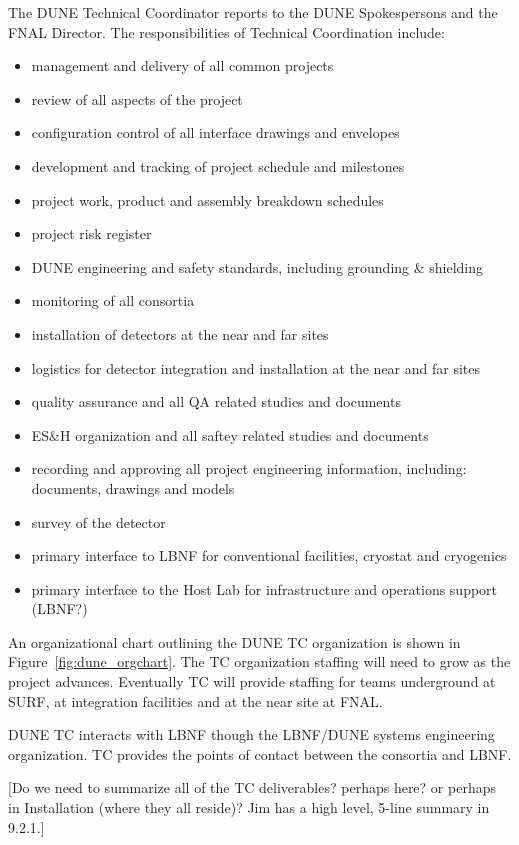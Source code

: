 The DUNE Technical Coordinator reports to the DUNE Spokespersons and the
FNAL Director. The responsibilities of Technical Coordination include:
\begin{itemize}
  \item management and delivery of all common projects
  \item review of all aspects of the project
  \item configuration control of all interface drawings and envelopes
  \item development and tracking of project schedule and milestones
  \item project work, product and assembly breakdown schedules
  \item project risk register
  \item DUNE engineering and safety standards, including grounding \& shielding
  \item monitoring of all consortia
  \item installation of detectors at the near and far sites
  \item logistics for detector integration and installation at the near and far sites
  \item quality assurance and all QA related studies and documents
  \item ES\&H organization and all saftey related studies and documents
  \item recording and approving all project engineering information, including: documents, drawings and models
  \item survey of the detector
  \item primary interface to LBNF for conventional facilities, cryostat and cryogenics
  \item primary interface to the Host Lab for infrastructure and operations support (LBNF?)
\end {itemize}

An organizational chart outlining the DUNE TC organization is shown in
Figure~\ref{fig:dune_orgchart}. The TC organization staffing will need
to grow as the project advances. Eventually TC will provide staffing
for teams underground at SURF, at integration facilities and at the
near site at FNAL.

DUNE TC interacts with LBNF though the LBNF/DUNE systems engineering
organization. TC provides the points of contact between the consortia
and LBNF.

[Do we need to summarize all of the TC deliverables? perhaps here? or
  perhaps in Installation (where they all reside)? Jim has a high
  level, 5-line summary in 9.2.1.]





